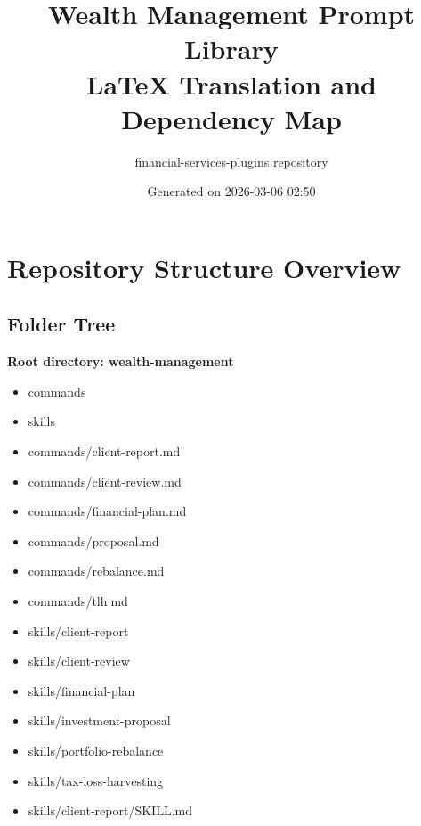 \documentclass[11pt]{article}
\title{Wealth Management Prompt Library\\LaTeX Translation and Dependency Map}
\author{financial-services-plugins repository}
\date{Generated on 2026-03-06 02:50 }
\begin{document}
\maketitle
\tableofcontents
\newpage

\section{Repository Structure Overview}

\subsection{Folder Tree}
\textbf{Root directory: wealth-management}
\begin{itemize}[leftmargin=*,itemsep=1pt,topsep=2pt]
\item \hspace*{0.0em}commands
\item \hspace*{0.0em}skills
\item \hspace*{0.9em}commands/client-report.md
\item \hspace*{0.9em}commands/client-review.md
\item \hspace*{0.9em}commands/financial-plan.md
\item \hspace*{0.9em}commands/proposal.md
\item \hspace*{0.9em}commands/rebalance.md
\item \hspace*{0.9em}commands/tlh.md
\item \hspace*{0.9em}skills/client-report
\item \hspace*{0.9em}skills/client-review
\item \hspace*{0.9em}skills/financial-plan
\item \hspace*{0.9em}skills/investment-proposal
\item \hspace*{0.9em}skills/portfolio-rebalance
\item \hspace*{0.9em}skills/tax-loss-harvesting
\item \hspace*{1.8em}skills/client-report/SKILL.md

\end{itemize}
\end{document}
